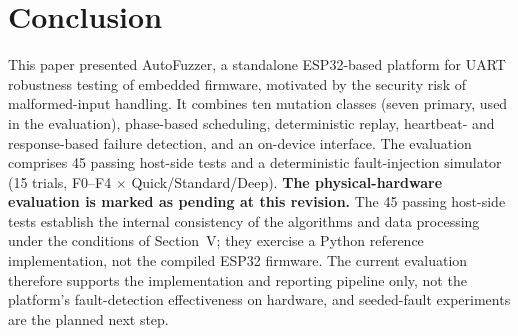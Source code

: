 \documentclass[10pt,letterpaper]{article}
\begin{document}
\section{Conclusion}
This paper presented AutoFuzzer, a standalone ESP32-based platform for UART robustness testing of embedded firmware, motivated by the security risk of malformed-input handling. It combines ten mutation classes (seven primary, used in the evaluation), phase-based scheduling, deterministic replay, heartbeat- and response-based failure detection, and an on-device interface. The evaluation comprises 45 passing host-side tests and a deterministic fault-injection simulator (15 trials, F0--F4 $\times$ Quick/Standard/Deep). \textbf{The physical-hardware evaluation is marked as pending at this revision.} The 45 passing host-side tests establish the internal consistency of the algorithms and data processing under the conditions of Section~V; they exercise a Python reference implementation, not the compiled ESP32 firmware. The current evaluation therefore supports the implementation and reporting pipeline only, not the platform's fault-detection effectiveness on hardware, and seeded-fault experiments are the planned next step.
\end{document}

